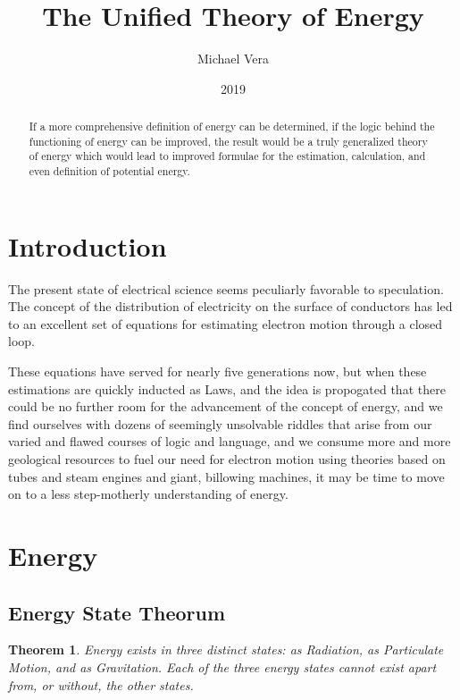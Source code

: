 \documentclass[12pt]{article}
\begin{document}
\title{The Unified Theory of Energy}
\author{Michael Vera}
\date{2019}
\maketitle

\begin{abstract}
If a more comprehensive definition of energy can be determined, if the logic behind the functioning of energy can be improved, the result would be a truly generalized theory of energy which would lead to improved formulae for the estimation, calculation, and even definition of potential energy.
\end{abstract}


\section*{Introduction}
The present state of electrical science seems peculiarly favorable to speculation. The concept of the distribution of electricity on the surface of conductors has led to an excellent set of equations for estimating electron motion through a closed loop. 

These equations have served for nearly five generations now, but when these estimations are quickly inducted as Laws, and the idea is propogated that there could be no further room for the advancement of the concept of energy, and we find ourselves with dozens of seemingly unsolvable riddles that arise from our varied and flawed courses of logic and language, and we consume more and more geological resources to fuel our need for electron motion using theories based on tubes and steam engines and giant, billowing machines, it may be time to move on to a less step-motherly understanding of energy.



\newpage
\section{Energy}

\subsection{Energy State Theorum}
\newtheorem{thm}{Theorem}


\begin{thm}
   Energy exists in three distinct states: as Radiation, as Particulate Motion, and as Gravitation. Each of the three energy states cannot exist apart from, or without, the other states.
\end{thm}
\end{document}
